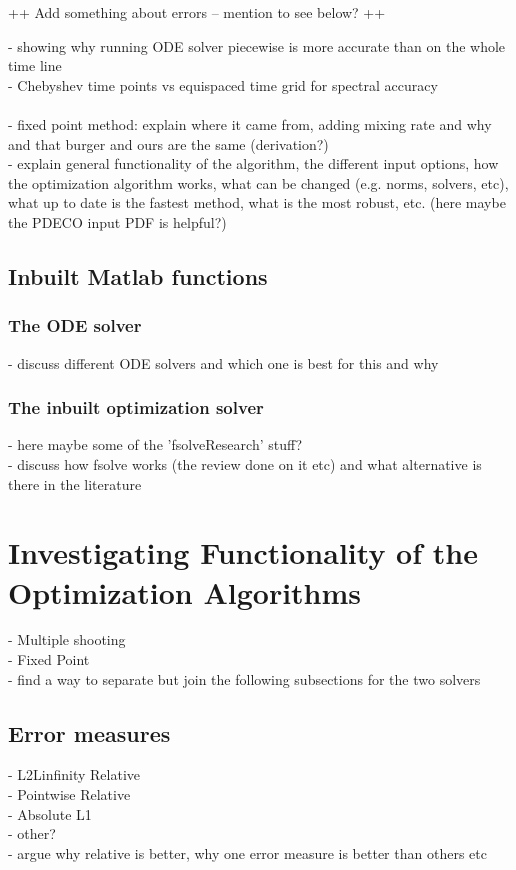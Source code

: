 \documentclass[11pt, a4paper]{article}
\theoremstyle{definition}
\begin{document}
++ Add something about errors -- mention to see below? ++

- showing why running ODE solver piecewise is more accurate than on the whole time line\\
- Chebyshev time points vs equispaced time grid for spectral accuracy\\
\\

- fixed point method: explain where it came from, adding mixing rate and why and that burger and ours are the same (derivation?)\\
- explain general functionality of the algorithm, the different input options, how the optimization algorithm works, what can be changed (e.g. norms, solvers, etc), what up to date is the fastest method, what is the most robust, etc. (here maybe the PDECO input PDF is helpful?)


\subsection{Inbuilt Matlab functions}
\subsubsection{The ODE solver}
- discuss different ODE solvers and which one is best for this and why
\subsubsection{The inbuilt optimization solver}
- here maybe some of the 'fsolveResearch' stuff?\\
- discuss how fsolve works (the review done on it etc) and what alternative is there in the literature\\

\section{Investigating Functionality of the Optimization Algorithms}
- Multiple shooting\\
- Fixed Point\\
- find a way to separate but join the following subsections for the two solvers\\
\subsection{Error measures}
- L2Linfinity Relative\\
- Pointwise Relative\\
- Absolute L1\\
- other?\\
- argue why relative is better, why one error measure is better than others etc
\end{document}

